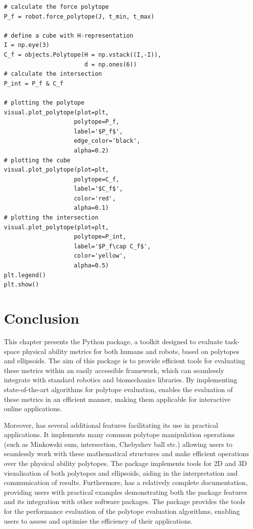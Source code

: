 {\begin{verbatim}
# calculate the force polytope
P_f = robot.force_polytope(J, t_min, t_max) 

# define a cube with H-representation
I = np.eye(3)
C_f = objects.Polytope(H = np.vstack((I,-I)), 
                       d = np.ones(6))  
# calculate the intersection
P_int = P_f & C_f
                    
# plotting the polytope
visual.plot_polytope(plot=plt, 
                    polytope=P_f, 
                    label='$P_f$',
                    edge_color='black',
                    alpha=0.2)
# plotting the cube
visual.plot_polytope(plot=plt, 
                    polytope=C_f,  
                    label='$C_f$',
                    color='red',
                    alpha=0.1)
# plotting the intersection
visual.plot_polytope(plot=plt, 
                    polytope=P_int, 
                    label='$P_f\cap C_f$',
                    color='yellow',
                    alpha=0.5)
plt.legend()
plt.show()
\end{verbatim}
}


\section{Conclusion}


This chapter presents the  Python package, a toolkit designed to evaluate task-space physical ability metrics for both humans and robots, based on polytopes and ellipsoids. The aim of this package is to provide efficient tools for evaluating these metrics within an easily accessible framework, which can seamlessly integrate with standard robotics and biomechanics libraries. By implementing state-of-the-art algorithms for polytope evaluation,  enables the evaluation of these metrics in an efficient manner, making them applicable for interactive online applications.

Moreover,  has several additional features facilitating its use in practical applications. It implements many common polytope manipulation operations (such as Minkowski sum, intersection, Chebyshev ball stc.) allowing users to seamlessly work with these mathematical structures and make efficient operations over the physical ability polytopes. The package implements tools for 2D and 3D visualisation of both polytopes and ellipsoids, aiding in the interpretation and communication of results. Furthermore,  has a relatively complete documentation, providing users with practical examples demonstrating both the package features and its integration with other software packages. The package provides the tools for the performance evaluation of the polytope evaluation algorithms, enabling users to assess and optimise the efficiency of their applications.

